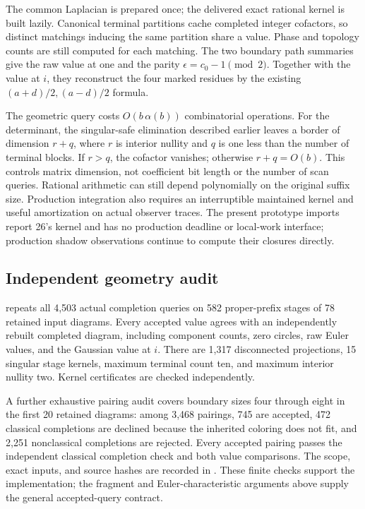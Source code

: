 The common Laplacian is prepared once; the delivered exact rational kernel
is built lazily.  Canonical terminal partitions cache completed integer
cofactors, so distinct matchings inducing the same partition share a
value.  Phase and topology counts are still computed for each matching.
The two boundary path summaries give the raw value at one and the parity
$\epsilon=c_0-1\pmod2$.  Together with the value at $i$, they reconstruct
the four marked residues by the existing $(a+d)/2,(a-d)/2$ formula.

The geometric query costs $O(b\,\alpha(b))$ combinatorial operations.
For the determinant, the singular-safe elimination described earlier leaves
a border of dimension $r+q$, where $r$ is interior nullity and $q$ is one
less than the number of terminal blocks.  If $r>q$, the cofactor vanishes;
otherwise $r+q=O(b)$.  This controls matrix dimension, not coefficient bit
length or the number of scan queries.  Rational arithmetic can still depend
polynomially on the original suffix size.  Production integration also
requires an interruptible maintained kernel and useful amortization on
actual observer traces.  The present prototype imports report 26's kernel
and has no production deadline or local-work interface; production shadow
observations continue to compute their closures directly.

\subsection{Independent geometry audit}

 repeats all 4,503
actual completion queries on 582 proper-prefix stages of 78 retained input
diagrams.  Every accepted value agrees with an independently rebuilt
completed diagram, including component counts, zero circles, raw Euler
values, and the Gaussian value at $i$.  There are 1,317 disconnected
projections, 15 singular stage kernels, maximum terminal count ten, and
maximum interior nullity two.  Kernel certificates are checked independently.

A further exhaustive pairing audit covers boundary sizes four through eight
in the first 20 retained diagrams: among 3,468 pairings, 745 are accepted,
472 classical completions are declined because the inherited coloring does
not fit, and 2,251 nonclassical completions are rejected.  Every accepted
pairing passes the independent classical completion check and both value
comparisons.  The scope, exact inputs, and source hashes are recorded in
.  These finite checks support the
implementation; the fragment and Euler-characteristic arguments above
supply the general accepted-query contract.

